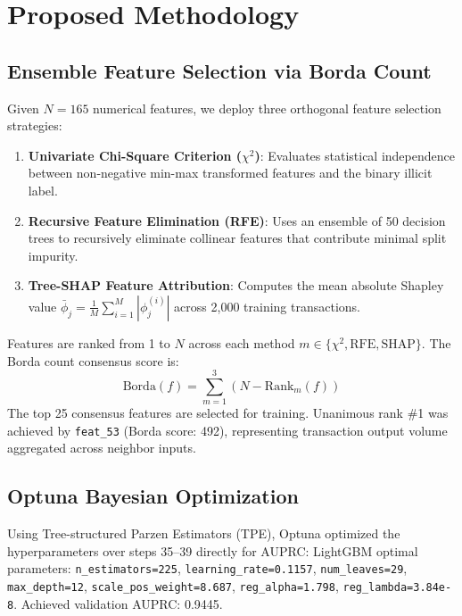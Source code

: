 \documentclass[conference]{IEEEtran}
\begin{document}
\section{Proposed Methodology}

\subsection{Ensemble Feature Selection via Borda Count}
Given $N = 165$ numerical features, we deploy three orthogonal feature selection strategies:
\begin{enumerate}
    \item \textbf{Univariate Chi-Square Criterion ($\chi^2$)}: Evaluates statistical independence between non-negative min-max transformed features and the binary illicit label.
    \item \textbf{Recursive Feature Elimination (RFE)}: Uses an ensemble of 50 decision trees to recursively eliminate collinear features that contribute minimal split impurity.
    \item \textbf{Tree-SHAP Feature Attribution}: Computes the mean absolute Shapley value $\bar{\phi}_j = \frac{1}{M}\sum_{i=1}^M |\phi_j^{(i)}|$ across 2,000 training transactions.
\end{enumerate}
Features are ranked from 1 to $N$ across each method $m \in \{\chi^2, \text{RFE}, \text{SHAP}\}$. The Borda count consensus score is:
\begin{equation}
\text{Borda}(f) = \sum_{m=1}^{3} \left( N - \text{Rank}_m(f) \right)
\end{equation}
The top 25 consensus features are selected for training. Unanimous rank \#1 was achieved by \texttt{feat\_53} (Borda score: 492), representing transaction output volume aggregated across neighbor inputs.

\subsection{Optuna Bayesian Optimization}
Using Tree-structured Parzen Estimators (TPE), Optuna optimized the hyperparameters over steps 35--39 directly for AUPRC:
LightGBM optimal parameters: \texttt{n\_estimators=225}, \texttt{learning\_rate=0.1157}, \texttt{num\_leaves=29}, \texttt{max\_depth=12}, \texttt{scale\_pos\_weight=8.687}, \texttt{reg\_alpha=1.798}, \texttt{reg\_lambda=3.84e-8}. Achieved validation AUPRC: 0.9445.
\end{document}
